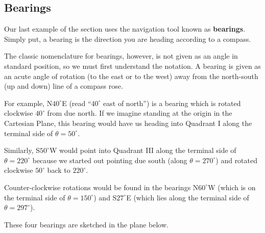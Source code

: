 \documentclass{ximera}
\begin{document}
\subsection{Bearings}
\label{bearings} 

Our last example of the section uses the navigation tool known as \textbf{bearings}.  Simply put, a bearing is the direction you are heading according to a compass.  

 

The classic nomenclature for bearings, however, is not given as an angle in standard position, so we must first understand the notation.  A bearing is given as an acute angle of rotation (to the east or to the west) away from the north-south (up and down) line of a compass rose.  

 

For example, N$40^{\circ}$E (read ``$40^{\circ}$ east of north'') is a bearing which is rotated clockwise $40^{\circ}$ from due north.  If we imagine standing at the origin in the Cartesian Plane, this bearing would have us heading into Quadrant I along the terminal side of $\theta = 50^{\circ}$. 

 

 Similarly, S$50^{\circ}$W would point into Quadrant III along the terminal side of $\theta = 220^{\circ}$ because we started out pointing due south (along $\theta = 270^{\circ}$) and rotated clockwise $50^{\circ}$ back to $220^{\circ}$.  
 
  
 
 Counter-clockwise rotations would be found in the bearings N$60^{\circ}$W (which is on the terminal side of $\theta = 150^{\circ}$) and S$27^{\circ}$E (which lies along the terminal side of $\theta = 297^{\circ}$). 
 
  
 
 These four bearings are sketched in the plane below.
\end{document}
